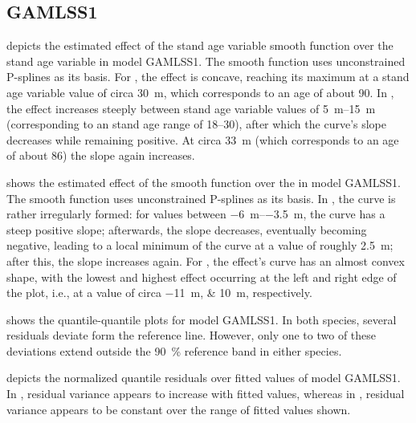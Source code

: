 \subsection{GAMLSS1}

 depicts the estimated effect of the stand age variable smooth function over the stand age variable in model GAMLSS1.  The smooth function uses unconstrained P-splines as its basis.  For \Beech{}, the effect is concave, reaching its maximum at a stand age variable value of circa \SI{30}{\meter}, which corresponds to an age of about \SI{90}{\year}.  In \Spruce{}, the effect increases steeply between stand age variable values of \SIrange{5}{15}{\meter} (corresponding to an stand age range of \SIrange{18}{30}{\year}), after which the curve’s slope decreases while remaining positive.  At circa \SI{33}{\meter} (which corresponds to an age of about \SI{86}{\year}) the slope again increases.

 shows the estimated effect of the \ProductivityIndexVariableText{} smooth function over the \ProductivityIndexVariableText{} in model GAMLSS1.  The smooth function uses unconstrained P-splines as its basis.  In \Beech{}, the curve is rather irregularly formed:  for \ProductivityIndexVariableText{} values between \SIrange{-6}{-3.5}{\meter}, the curve has a steep positive slope;  afterwards, the slope decreases, eventually becoming negative, leading to a local minimum of the curve at a \ProductivityIndexVariableText{} value of roughly \SI{2.5}{\meter}; after this, the slope increases again.  For \Spruce{}, the effect’s curve has an almost convex shape, with the lowest and highest effect occurring at the left and right edge of the plot, i.e., at a \ProductivityIndexVariableText{} value of circa \SIlist{-11;10}{\meter}, respectively.

 shows the quantile-quantile plots for model GAMLSS1.  In both species, several residuals deviate form the reference line.  However, only one to two of these deviations extend outside the \SI{90}{\percent} reference band in either species.

 depicts the normalized quantile residuals over fitted values of model GAMLSS1.  In \Beech{}, residual variance appears to increase with fitted values, whereas in \Spruce{}, residual variance appears to be constant over the range of fitted values shown.

